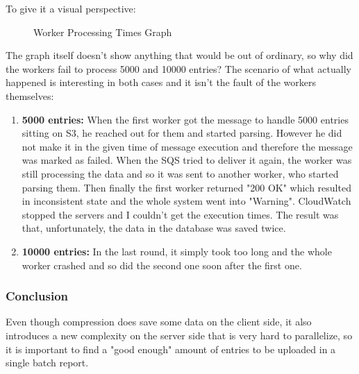 \newpage

To give it a visual perspective:

\begin{figure}[!ht]
\begin{center}
\end{center}
\caption{Worker Processing Times Graph}
\end{figure}

The graph itself doesn't show anything that would be out of ordinary, so why did the workers fail to process 5000 and 10000 entries? The scenario of what actually happened is interesting in both cases and it isn't the fault of the workers themselves:

\begin{enumerate}
	\item {\bf 5000 entries: } When the first worker got the message to handle 5000 entries sitting on S3, he reached out for them and started parsing. However he did not make it in the given time of message execution and therefore the message was marked as failed. When the SQS tried to deliver it again, the worker was still processing the data and so it was sent to another worker, who started parsing them. Then finally the first worker returned "200 OK" which resulted in inconsistent state and the whole system went into "Warning". CloudWatch stopped the servers and I couldn't get the execution times. The result was that, unfortunately, the data in the database was saved twice.
	\item {\bf 10000 entries: } In the last round, it simply took too long and the whole worker crashed and so did the second one soon after the first one.
\end{enumerate}

\subsubsection*{Conclusion}

Even though compression does save some data on the client side, it also introduces a new complexity on the server side that is very hard to parallelize, so it is important to find a "good enough" amount of entries to be uploaded in a single batch report.

